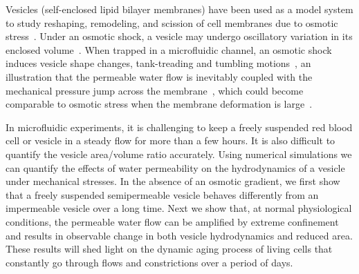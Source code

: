 \documentclass[9pt,twocolumn,twoside,lineno]{pnas-new}
\begin{document}


Vesicles (self-enclosed lipid bilayer membranes) have been
used as a model system to study reshaping, remodeling, and scission of
cell membranes due to osmotic stress~\cite{OgleckaEtAl2014_eLife,
CamposSaric2020_bioRxiv, Dimova2020_GVB, BhatiaChrist2020_SoftMatt}.
Under an osmotic shock, a vesicle may undergo oscillatory variation in
its enclosed volume~\cite{ChabanonHoLiedberg2017_BJ}. When trapped in a
microfluidic channel, an osmotic shock induces vesicle shape changes,
tank-treading and tumbling
motions~\cite{BhatiaRobinsonDimova2020_SoftMatt,
BhatiaChrist2020_SoftMatt}, an illustration that the permeable water
flow is inevitably coupled with the mechanical pressure jump across the
membrane~\cite{yao-mor2017}, which could become comparable to osmotic
stress when the membrane deformation is large~\cite{LiMoriSun2015_PRL,
yao-mor2017}. 

In microfluidic experiments, it is challenging to keep a freely
suspended red blood cell or vesicle in a steady flow for more than a few
hours. It is also difficult to quantify the vesicle area/volume ratio
accurately.  Using numerical simulations we can quantify the effects of
water permeability on the hydrodynamics of a vesicle under mechanical
stresses. 
In the absence of an osmotic gradient, we first show that
a freely suspended semipermeable vesicle behaves differently from an
impermeable vesicle over a long time. Next we show that, at normal
physiological conditions, the permeable water flow can be amplified by
extreme confinement and results in observable change in both vesicle
hydrodynamics and reduced area. These results will shed light on the
dynamic aging process of living cells that constantly go through flows
and constrictions over a period of days.
 
\end{document}
